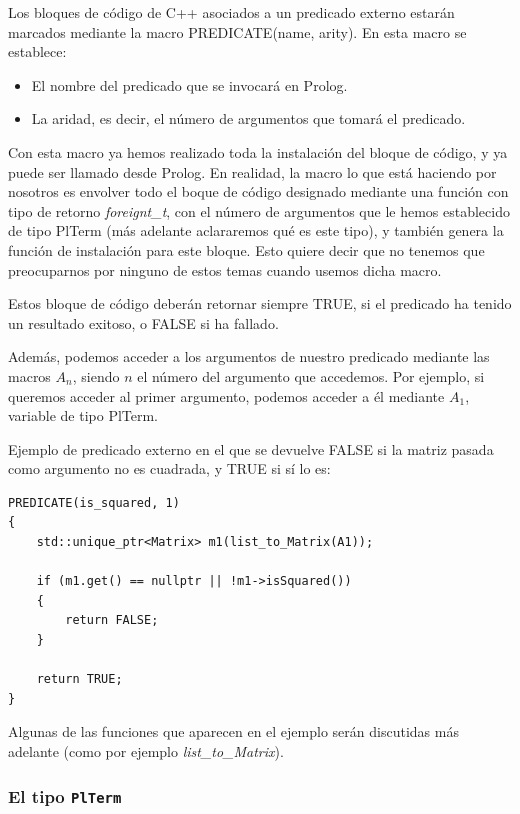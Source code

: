 \documentclass[a4paper,12pt]{article}
\begin{document}
Los bloques de código de C++ asociados a un predicado externo estarán marcados mediante la macro PREDICATE(name, arity). En esta macro se establece:

\begin{itemize}
\item El nombre del predicado que se invocará en Prolog.
\item La aridad, es decir, el número de argumentos que tomará el predicado.
\end{itemize}

Con esta macro ya hemos realizado toda la instalación del bloque de código, y ya puede ser llamado desde Prolog. En realidad, la macro lo que está haciendo por nosotros es envolver todo el boque de código designado mediante una función con tipo de retorno \textit{foreignt\_t}, con el número de argumentos que le hemos establecido de tipo PlTerm (más adelante aclararemos qué es este tipo), y también genera la función de instalación para este bloque. Esto quiere decir que no tenemos que preocuparnos por ninguno de estos temas cuando usemos dicha macro.

Estos bloque de código deberán retornar siempre TRUE, si el predicado ha tenido un resultado exitoso, o FALSE si ha fallado.

Además, podemos acceder a los argumentos de nuestro predicado mediante las macros $A_n$, siendo $n$ el número del argumento que accedemos. Por ejemplo, si queremos acceder al primer argumento, podemos acceder a él mediante $A_1$, variable de tipo PlTerm.

Ejemplo de predicado externo en el que se devuelve FALSE si la matriz pasada como argumento no es cuadrada, y TRUE si sí lo es:

\begin{lstlisting}[style=C++]
PREDICATE(is_squared, 1)
{
	std::unique_ptr<Matrix> m1(list_to_Matrix(A1));
	
	if (m1.get() == nullptr || !m1->isSquared())
	{
		return FALSE;
	}
	
	return TRUE;
}
\end{lstlisting}

Algunas de las funciones que aparecen en el ejemplo serán discutidas más adelante (como por ejemplo \textit{list\_to\_Matrix}).

\subsubsection{El tipo \texttt{PlTerm}}
\end{document}
